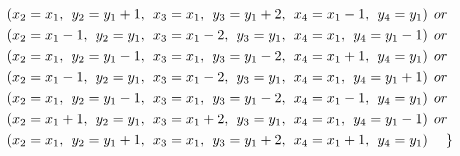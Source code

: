 \begin{appendices}
\begin{itemize}
\begin{align*}
&(x_{2} = x_{1},\hspace{1ex}y_{2} = y_{1}+1,\hspace{1ex}x_{3} = x_{1}, \hspace{1ex}y_{3} = y_{1}+2,\hspace{1ex}x_{4} = x_{1}-1,\hspace{1ex}y_{4} = y_{1})\hspace{1ex} or\\
&(x_{2} = x_{1}-1,\hspace{1ex}y_{2} = y_{1},\hspace{1ex}x_{3} = x_{1}-2,\hspace{1ex} y_{3} = y_{1},\hspace{1ex}x_{4} = x_{1},\hspace{1ex}y_{4} = y_{1}-1)\hspace{1ex} or\\
&(x_{2} = x_{1},\hspace{1ex}y_{2} = y_{1}-1,\hspace{1ex}x_{3} = x_{1}, \hspace{1ex}y_{3} = y_{1}-2,\hspace{1ex}x_{4} = x_{1}+1,\hspace{1ex}y_{4} = y_{1})\hspace{1ex} or\\
&(x_{2} = x_{1}-1,\hspace{1ex}y_{2} = y_{1},\hspace{1ex}x_{3} = x_{1}-2, \hspace{1ex}y_{3} = y_{1},\hspace{1ex}x_{4} = x_{1},\hspace{1ex}y_{4} = y_{1}+1)\hspace{1ex} or\\
&(x_{2} = x_{1},\hspace{1ex}y_{2} = y_{1}-1,\hspace{1ex}x_{3} = x_{1}, \hspace{1ex}y_{3} = y_{1}-2,\hspace{1ex}x_{4} = x_{1}-1,\hspace{1ex}y_{4} = y_{1})\hspace{1ex} or\\
&(x_{2} = x_{1}+1,\hspace{1ex}y_{2} = y_{1},\hspace{1ex}x_{3} = x_{1}+2, \hspace{1ex}y_{3} = y_{1},\hspace{1ex}x_{4} = x_{1},\hspace{1ex}y_{4} = y_{1}-1)\hspace{1ex} or\\
&(x_{2} = x_{1},\hspace{1ex}y_{2} = y_{1}+1,\hspace{1ex}x_{3} = x_{1}, \hspace{1ex}y_{3} = y_{1}+2,\hspace{1ex}x_{4} = x_{1}+1,\hspace{1ex}y_{4} = y_{1})\hspace{3ex} \} 
\end{align*}
\end{itemize}


\end{appendices}
